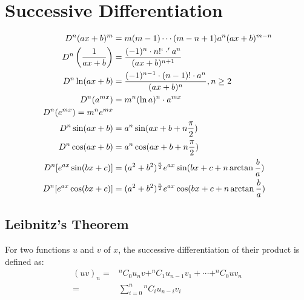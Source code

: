 \documentclass[../main.tex]{subfile}
\begin{document}
    \chapter{Successive Differentiation}
    \begin{align}
        D^n (ax + b)^m & = m(m-1)\cdots(m-n+1) a^n (ax+b)^{m-n}\\
        D^n \left( \dfrac{1}{ax + b} \right) & = \dfrac{(-1)^n \cdot n!`\cdot' a^n}{(ax + b)^{n + 1}} \\
        D^n \ln(ax + b) & = \dfrac{(-1)^{n-1} \cdot (n-1)! \cdot a^n}{(ax + b)^n}, n \geq 2 \\
        D^n (a^{mx}) & = m^n (\ln a)^n \cdot a^{mx} \\
        D^n (e^{mx})=m^n e^{mx} \\
        D^n \sin (ax + b) & = a^n \sin(ax + b + n \frac{\pi}{2}) \\
        D^n \cos (ax + b) & = a^n \cos(ax + b + n \frac{\pi}{2})\\
        D^n [e^{ax} \sin(bx + c)] & = (a^2 + b^2)^{\frac{n}{2}} e^{ax} \sin(bx + c + n \arctan \frac{b}{a})\\
        D^n [e^{ax} \cos(bx + c)] & = (a^2 + b^2)^{\frac{n}{2}} e^{ax} \cos(bx + c + n \arctan \frac{b}{a})
    \end{align}
        
        \section{Leibnitz's Theorem}
        For two functions $u$ and $v$ of $x$, the successive differentiation of their product is defined as:
    \begin{align}
        (uv)_n = &^nC_0 u_n v+^nC_1 u_{n-1} v_1+\cdots+^nC_0 u v_n\\
         = & \sum_{i=0}^n {^nC_i} u_{n-i} v_i
    \end{align}
\end{document}
